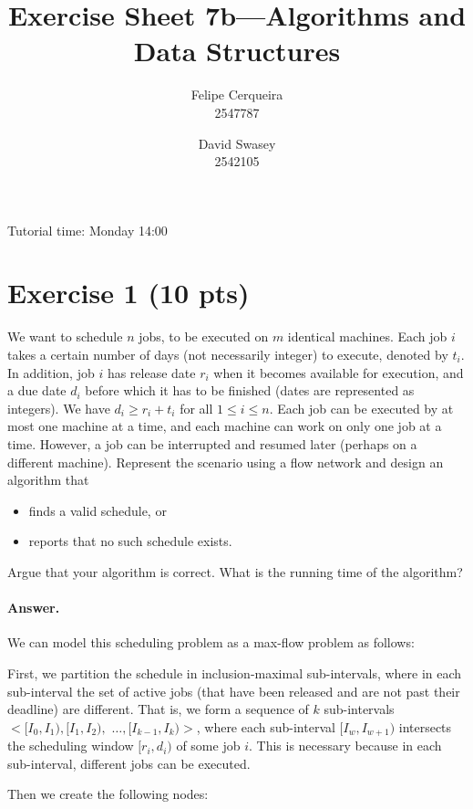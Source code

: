 \documentclass[a4paper]{article}
\title{Exercise Sheet 7b---Algorithms and Data Structures}
\author{Felipe Cerqueira \\ 2547787 \and David Swasey \\ 2542105}
\begin{document}
\maketitle

Tutorial time: Monday 14:00

\section*{Exercise 1 (10 pts)}

We want to schedule $n$ jobs, to be executed on $m$ identical machines. Each job
$i$ takes a certain number of days (not necessarily integer) to execute, denoted by
$t_i$. In addition, job $i$ has release date $r_i$ when it becomes available for execution, and a due date $d_i$ before which it has to be finished (dates are represented as integers). We have $d_i \ge r_i + t_i$ for all $1 \le i \le n$.
Each job can be executed by at most one machine at a time, and each machine can work on only one job at a time. However, a job can be interrupted and resumed later (perhaps on a different machine). Represent the scenario using a flow network and design an algorithm that

\begin{itemize}
\item finds a valid schedule, or
\item reports that no such schedule exists.
\end{itemize}

\noindent Argue that your algorithm is correct. What is the running time of the algorithm?

\paragraph{Answer.}

We can model this scheduling problem as a max-flow problem as follows:

\medskip

First, we partition the schedule in inclusion-maximal sub-intervals, where in each sub-interval the set of active jobs (that have been released and are not past their deadline) are different. That is, we form a sequence of $k$ sub-intervals $<[I_0, I_1), [I_1, I_2), $ $\ldots,$$ [I_{k-1}, I_k)>$, where each sub-interval $[I_w, I_{w+1})$ intersects the scheduling window $[r_i, d_i)$ of some job $i$. This is necessary because in each sub-interval, different jobs can be executed.

\noindent Then we create the following nodes:
\end{document}
